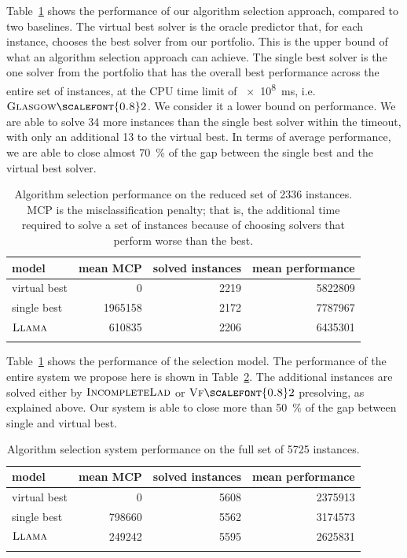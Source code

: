\documentclass{llncs}
\newcommand{\VFtwo}{$\textsc{Vf{\scalefont{0.8}2}}$\xspace}
\newcommand{\IncompleteLAD}{$\textsc{IncompleteLad}$\xspace}
\newcommand{\GlasgowTwo}{$\textsc{Glasgow{\scalefont{0.8}2}}$\xspace}
\newcommand{\LLAMA}{$\textsc{Llama}$\xspace}
\begin{document}
Table~\ref{tab:res} shows the performance of our algorithm selection approach, compared to two
baselines. The virtual best solver is the oracle predictor that, for each instance, chooses the best
solver from our portfolio. This is the upper bound of what an algorithm selection approach can
achieve. The single best solver is the one solver from the portfolio that has the overall best
performance across the entire set of instances, at the CPU time limit of \SI{e8}{\ms},
i.e.\ \GlasgowTwo. We consider it a lower bound on performance.
We are able to solve 34 more instances than the single best solver within the timeout, with only an
additional 13 to the virtual best. In terms of average performance, we are able to close almost
\SI{70}{\percent} of the gap between the single best and the virtual best solver.

\begin{table}[ht]
    \centering\setlength{\tabcolsep}{1em}
\begin{tabular}{lrrr}
  \toprule
model & mean MCP & solved instances & mean performance\\
  \midrule
virtual best & 0 & 2219 & 5822809\\
single best & 1965158 & 2172 & 7787967\\
\LLAMA & 610835 & 2206 & 6435301\\
   \bottomrule \\
\end{tabular}
\caption{Algorithm selection performance on the reduced set of 2336
instances. MCP is the misclassification penalty; that is, the additional time
required to solve a set of instances because of choosing solvers that perform
worse than the best.}\label{tab:res} \end{table}

Table~\ref{tab:res} shows the performance of the selection model. The performance of the entire
system we propose here is shown in Table~\ref{tab:resfull}. The additional instances are solved
either by \IncompleteLAD or \VFtwo presolving, as explained above. Our system is able to close more than
\SI{50}{\percent} of the gap between single and virtual best.

\begin{table}[ht]
    \centering\setlength{\tabcolsep}{1em}
\begin{tabular}{lrrr}
  \toprule
model & mean MCP & solved instances & mean performance\\
  \midrule
virtual best & 0 & 5608 & 2375913\\
single best & 798660 & 5562 & 3174573\\
\LLAMA & 249242 & 5595 & 2625831\\
   \bottomrule \\
\end{tabular}
\caption{Algorithm selection system performance on the full set of 5725
instances.}\label{tab:resfull}
\end{table}
\end{document}
